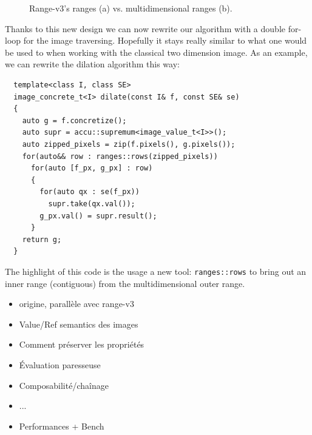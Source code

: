 \begin{figure}[htbp]
  \centering
  \caption{Range-v3's ranges (a) vs. multidimensional ranges (b).}
  \label{fig.inner.outer.range}
\end{figure}

Thanks to this new design we can now rewrite our algorithm with a double for-loop for the image traversing. Hopefully it
stays really similar to what one would be used to when working with the classical two dimension image. As an example, we
can rewrite the dilation algorithm this way:

\begin{verbatim}
  template<class I, class SE>
  image_concrete_t<I> dilate(const I& f, const SE& se)
  {
    auto g = f.concretize();
    auto supr = accu::supremum<image_value_t<I>>();
    auto zipped_pixels = zip(f.pixels(), g.pixels());
    for(auto&& row : ranges::rows(zipped_pixels))
      for(auto [f_px, g_px] : row)
      {
        for(auto qx : se(f_px))
          supr.take(qx.val());
        g_px.val() = supr.result();
      }
    return g;
  }
\end{verbatim}

The highlight of this code is the usage a new tool: \texttt{ranges::rows} to bring out an inner range (contiguous) from
the multidimensional outer range.

\clearpage

\begin{itemize}
  \item origine, parallèle avec range-v3
  \item Value/Ref semantics des images
  \item Comment préserver les propriétés
  \item Évaluation paresseuse
  \item Composabilité/chaînage
  \item ...
  \item Performances + Bench
\end{itemize}